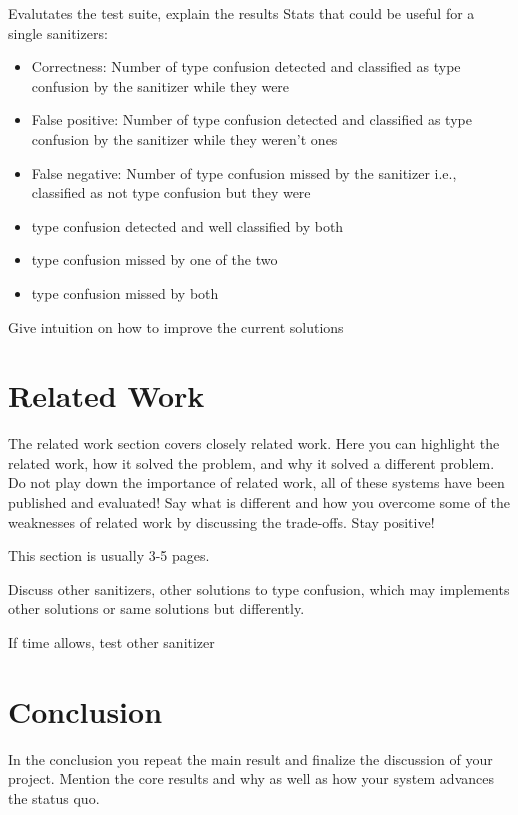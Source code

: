 \documentclass[a4paper,11pt,oneside]{report}
\begin{document}
Evalutates the test suite, explain the results
Stats that could be useful for a single sanitizers:
\begin{itemize}
       \item Correctness: Number of type confusion detected and classified as type confusion by the sanitizer while they were
       \item False positive: Number of type confusion detected and classified as type confusion by the sanitizer while they weren't ones
       \item False negative: Number of type confusion missed by the sanitizer i.e., classified as not type confusion but they were

       \item type confusion detected and well classified by both
       \item type confusion missed by one of the two
       \item type confusion missed by both
\end{itemize}

Give intuition on how to improve the current solutions

\chapter{Related Work}

The related work section covers closely related work. Here you can highlight
the related work, how it solved the problem, and why it solved a different
problem. Do not play down the importance of related work, all of these
systems have been published and evaluated! Say what is different and how
you overcome some of the weaknesses of related work by discussing the 
trade-offs. Stay positive!

This section is usually 3-5 pages.

Discuss other sanitizers, other solutions to type confusion,
which may implements other solutions or same solutions but differently.

If time allows, test other sanitizer




\chapter{Conclusion}

In the conclusion you repeat the main result and finalize the discussion of
your project. Mention the core results and why as well as how your system
advances the status quo.
\end{document}
